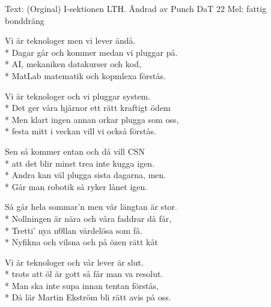 \newpage
\begin{SongText}[Vi är teknologer]
    \begin{SongInfo}
        Text: (Orginal) I-sektionen LTH. Ändrad av Punch DaT 22
        Mel: fattig bonddräng
    \end{SongInfo}
    \begin{SongVerse}
        Vi är teknologer men vi lever ändå.\\*%
        Dagar går och kommer medan vi pluggar på.\\*%
        AI, mekaniken datakurser och kod,\\*%
        MatLab matematik och kopmlexa förstås.
    \end{SongVerse}
    \begin{SongVerse}
        Vi är teknologer och vi pluggar system.\\*%
        Det ger våra hjärnor ett rätt kraftigt ödem\\*%
        Men klart ingen annan orkar plugga som oss,\\*%
        festa mitt i veckan vill vi också förstås.
    \end{SongVerse}
    \begin{SongVerse}
        Sen så kommer entan och då vill CSN\\*%
        att det blir minst trea inte kugga igen.\\*%
        Andra kan väl plugga sista dagarna, men.\\*%
        Går man robotik så ryker lånet igen.
    \end{SongVerse}
    \begin{SongVerse}
        Så går hela sommar'n men vår längtan är stor.\\*%
        Nollningen är nära och våra faddrar då får,\\*%
        Tretti' nya n0llan värdelösa som få.\\*%
        Nyfikna och vilsna och på özen rätt kåt
    \end{SongVerse}
    \begin{SongVerse}
        Vi är teknologer och vår lever är slut.\\*%
        trots att öl är gott så får man va resolut.\\*%
        Man ska inte supa innan tentan förstås,\\*%
        Då lär Martin Ekström bli rätt avis på oss.
    \end{SongVerse}
\end{SongText}
